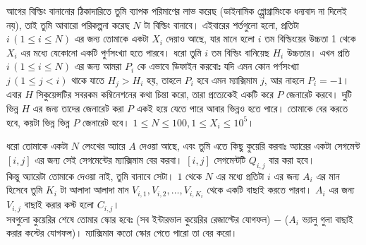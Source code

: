 \begin{example}
  আগের বিল্ডিং বানানোর ঠিকাদারিতে তুমি ব্যাপক পরিমাণের লাভ করেছ (ডাইনামিক
  প্প্রোগ্রামিংকে ধন্যবাদ না দিলেই নয়), তাই তুমি আবারো পরিকল্পনা করেছ $N$ টা
  বিল্ডিং বানাবে। এইবারের শর্তগুলো হলো, প্রতিটা $i \, (1 \le i \le N)$ এর
  জন্য তোমাকে একটা $X_i$ দেয়াও আছে, যার মানে হলো $i$ তম বিল্ডিংয়ের উচ্চতা 1
  থেকে $X_i$ এর মধ্যে যেকোনো একটি পুর্ণসংখ্যা হতে পারবে। ধরো তুমি $i$ তম
  বিল্ডিং বানিয়েছ $H_i$ উচ্চতার। এখন প্রতি $i \, (1 \le i \le N)$ এর জন্য
  আমরা $P_i$ কে এভাবে ডিফাইন করবোঃ যদি এমন কোন পর্ণসংখ্যা $j \, (1 \le j <
  i)$ থাকে যাতে $H_j > H_i$ হয়, তাহলে $P_i$ হবে এমন ম্যাক্সিমাম $j$, আর নাহলে
  $P_i = -1$। এবার $H$ সিকুয়েন্সটির সবরকম কম্বিনেশনের কথা চিন্তা করো, তারা
  প্রত্যেকেই একটি করে $P$ জেনারেট করবে। দুটি ভিন্ন $H$ এর জন্য তাদের জেনারেট
  করা $P$ একই হয়ে যেতে পারে আবার ভিন্নও হতে পারে। তোমাকে বের করতে হবে, কয়টা
  ভিন্ন ভিন্ন $P$ জেনারেট হবে। $1 \le N \le 100, 1 \le X_i \le 10^5$।
\end{example}

\begin{example}
  ধরো তোমাকে একটা $N$ লেংথের অ্যারে $A$ দেওয়া আছে, এবং তুমি এতে কিছু কুয়েরি
  করবাঃ অ্যারের একটা সেগমেন্ট $[i, j]$ এর জন্য সেই সেগমেন্টের ম্যাক্সিমাম বের
  করবা। $[i, j]$ সেগমেন্টটি $Q_{i, j}$ বার করা হবে।\\
  কিন্তু অ্যারেটা তোমাকে দেওয়া নাই, তুমি বানাবে সেটা। $1$ থেকে $N$ এর মধ্যে
  প্রতিটা $i$ এর জন্য $A_i$ এর মান হিসেবে তুমি $K_i$ টা আলাদা আলাদা মান
  $V_{i,1}, V_{i,2}, \ldots, V_{i, K_i}$ থেকে একটি বাছাই করতে পারবা। $A_i$ এর
  জন্য $V_{i, j}$ বাছাই করার কস্ট হলো $C_{i, j}$।\\
  সবগুলো কুয়েরির শেষে তোমার স্কোর হবেঃ (সব ইন্টারভাল কুয়েরির রেজাল্টের যোগফল)
  $-$ ($A_i$ ভ্যালু গুলা বাছাই করার কস্টের যোগফল)। ম্যাক্সিমাম কতো স্কোর পেতে
  পারো তা বের করো।
\end{example}